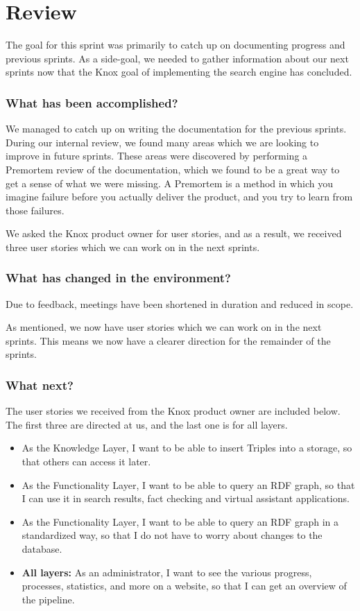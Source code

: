 \section{Review}
The goal for this sprint was primarily to catch up on documenting progress and previous sprints. As a side-goal, we needed to gather information about our next sprints now that the Knox goal of implementing the search engine has concluded.

\subsubsection*{What has been accomplished?}
We managed to catch up on writing the documentation for the previous sprints. During our internal review, we found many areas which we are looking to improve in future sprints. These areas were discovered by performing a Premortem review of the documentation, which we found to be a great way to get a sense of what we were missing. A Premortem is a method in which you imagine failure before you actually deliver the product, and you try to learn from those failures\cite{PremortemSadanForbedrer}.

We asked the Knox product owner for user stories, and as a result, we received three user stories which we can work on in the next sprints.

\subsubsection*{What has changed in the environment?}
Due to feedback, meetings have been shortened in duration and reduced in scope. 

As mentioned, we now have user stories which we can work on in the next sprints. This means we now have a clearer direction for the remainder of the sprints.

\subsubsection*{What next?}
The user stories we received from the Knox product owner are included below. The first three are directed at us, and the last one is for all \knox{} layers.

\begin{itemize}
    \item As the Knowledge Layer, I want to be able to insert Triples into a storage, so that others can access it later.
    \item As the Functionality Layer, I want to be able to query an RDF graph, so that I can use it in search results, fact checking and virtual assistant applications.
    \item As the Functionality Layer, I want to be able to query an RDF graph in a standardized way, so that I do not have to worry about changes to the database.
    \item \textbf{All layers:} As an administrator, I want to see the various progress, processes, statistics, and more on a website, so that I can get an overview of the pipeline. 
\end{itemize} 

